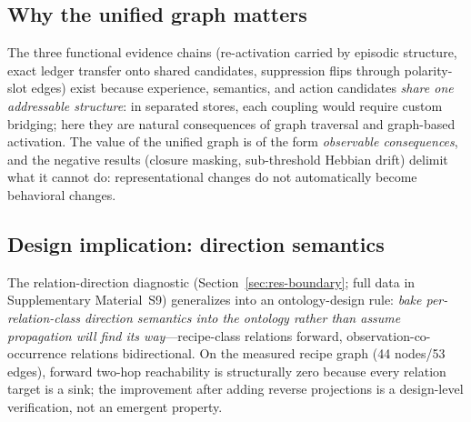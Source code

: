 \documentclass[10pt,a4paper]{article}
\begin{document}
\subsection{Why the unified graph matters}
The three functional evidence chains (re-activation carried by episodic structure, exact ledger transfer onto shared candidates, suppression flips through polarity-slot edges) exist because experience, semantics, and action candidates \emph{share one addressable structure}: in separated stores, each coupling would require custom bridging; here they are natural consequences of graph traversal and graph-based activation. The value of the unified graph is of the form \emph{observable consequences}, and the negative results (closure masking, sub-threshold Hebbian drift) delimit what it cannot do: representational changes do not automatically become behavioral changes.

\subsection{Design implication: direction semantics}
The relation-direction diagnostic (Section~\ref{sec:res-boundary}; full data in Supplementary Material~S9) generalizes into an ontology-design rule: \emph{bake per-relation-class direction semantics into the ontology rather than assume propagation will find its way}---recipe-class relations forward, observation-co-occurrence relations bidirectional. On the measured recipe graph (44 nodes/53 edges), forward two-hop reachability is structurally zero because every relation target is a sink; the improvement after adding reverse projections is a design-level verification, not an emergent property.
\end{document}
